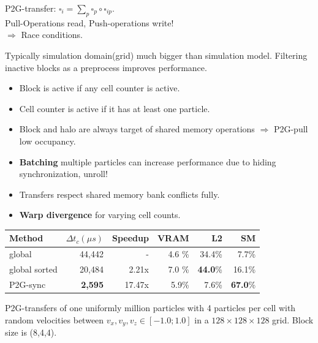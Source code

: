 \documentclass{beamer}
\begin{document}
\begin{frame}
\begin{minipage}{\textwidth}
  P2G-transfer: $\square_i = \sum_p \square_p \circ \square_{ip}.$\\
  
  Pull-Operations read, Push-operations write!\\
  $\Rightarrow$ Race conditions.
\end{minipage}
\end{frame}
\begin{frame}
  Typically simulation domain(grid) much bigger than simulation model. Filtering inactive blocks as a preprocess improves performance.
\begin{itemize}
  \item Block is active if any cell counter is active.
  \item Cell counter is active if it has at least one particle.
\end{itemize}
\vfill
\begin{minipage}{0.9\textwidth}
  \footnotesize
  
\end{minipage}
\end{frame}
\begin{frame}
\begin{itemize}
  \item Block and halo are always target of shared memory operations $\Rightarrow$ P2G-pull low occupancy.
  \item \textbf{Batching} multiple particles can increase performance due to hiding synchronization, unroll!
  \item Transfers respect shared memory bank conflicts fully.
  \item \textbf{Warp divergence} for varying cell counts.
\end{itemize}

{\footnotesize
\begin{table}
  \begin{tabular}{ | l | r | r | r | r | r |}    \hline
    Method                 &  $\Delta t_c(\mu s)$ &Speedup         &VRAM  & L2   &SM     \\\hline
    global                 &   44,442             &-               &4.6 \%&34.4\%&7.7\%  \\\hline
    global sorted          &   20,484		  &2.21x           &7.0 \%&\textbf{44.0}\%&16.1\% \\\hline
    P2G-sync              &    \textbf{2,595}    &17.47x          &5.9\%&7.6\%  &\textbf{67.0}\%\\\hline
 \end{tabular}
\end{table}
P2G-transfers of one uniformly million particles with 4 particles per cell with random velocities between $v_x,v_y,v_z \in [-1.0;1.0]$ in a $128\times 128\times128$ grid. Block size is (8,4,4).
}

\end{frame}
\end{document}
